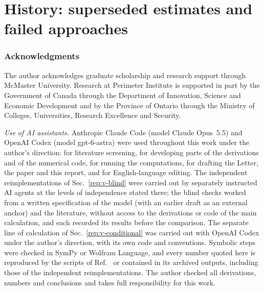 \documentclass[11pt,a4paper]{article}
\numberwithin{equation}{section}%
\begin{document}
\clearpage
\part{History: superseded estimates and failed approaches}


\clearpage
\appendix



\section*{Acknowledgments}
The author acknowledges graduate scholarship and research support through McMaster University.
Research at Perimeter Institute is supported in part by the Government of Canada through the Department of Innovation, Science and Economic Development and by the Province of Ontario through the Ministry of Colleges, Universities, Research Excellence and Security.

\emph{Use of AI assistants.}
Anthropic Claude Code (model Claude Opus~5.5) and OpenAI Codex (model gpt-6-astra) were used throughout this work under the author's direction: for literature screening, for developing parts of the derivations and of the numerical code, for running the computations, for drafting the Letter, the paper and this report, and for English-language editing.
The independent reimplementations of Sec.~\ref{rep:v-blind} were carried out by separately instructed AI agents at the levels of independence stated there; the blind checks worked from a written specification of the model (with an earlier draft as an external anchor) and the literature, without access to the derivations or code of the main calculation, and each recorded its results before the comparison.
The separate line of calculation of Sec.~\ref{rep:v-conditional} was carried out with OpenAI Codex under the author's direction, with its own code and conventions.
Symbolic steps were checked in SymPy or Wolfram Language, and every number quoted here is reproduced by the scripts of Ref.~\cite{DNECv12code} or contained in its archived outputs, including those of the independent reimplementations.
The author checked all derivations, numbers and conclusions and takes full responsibility for this work.

%

\end{document}
